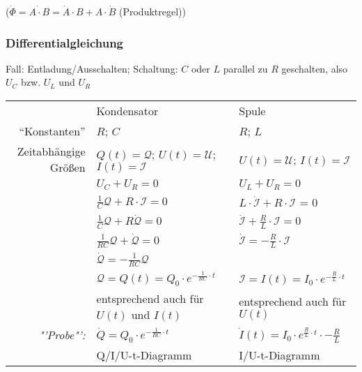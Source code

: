 \documentclass[a4paper]{scrartcl}
\begin{document}
($\dot{\Phi}=\dot{A \cdot B} = \dot{A} \cdot B + A \cdot \dot{B}$ 
(Produktregel))

\subsubsection{Differentialgleichung}
Fall: Entladung/Ausschalten; Schaltung: $C$ oder $L$ parallel zu $R$ 
geschalten, also $U_C$ bzw. $U_L$ und $U_R$
\\ \begin{tabular}{rl|l}
& Kondensator						& Spule \\ %
"`Konstanten"'&$R$; $C$				& $R$; $L$ \\
Zeitabhängige Größen & $Q(t)=\mathcal{Q}$; $U(t)=\mathcal{U}$; 
	$I(t)=\mathcal{I}$ 				& $U(t)=\mathcal{U}$; $I(t)=\mathcal{I}$ \\
& $U_C + U_R = 0$ & $U_L + U_R = 0$ \\
& $\frac{1}{C} \mathcal{Q} + R \cdot \mathcal{I} = 0$ &
	$L \cdot \dot{\mathcal{I}} + R \cdot \mathcal{I}$ = 0 \\
& $\frac{1}{C} \mathcal{Q} + R \dot{\mathcal{Q}} = 0$ &
	$\dot{\mathcal{I}} + \frac{R}{L} \cdot \mathcal{I} = 0$ \\
& $\frac{1}{RC} \mathcal{Q} + \dot{\mathcal{Q}} = 0$ &
	$\dot{\mathcal{I}} = -\frac{R}{L} \cdot \mathcal{I}$ \\
& $\dot{\mathcal{Q}} = - \frac{1}{RC} \mathcal{Q}$ & \\
\hline %
& $\mathcal{Q} = Q(t) = Q_0 \cdot e^{-\frac{1}{RC} \cdot t}$ &
	$\mathcal{I} = I(t) = I_0 \cdot e^{-\frac{R}{L} \cdot t}$ \\
& entsprechend auch für $U(t)$ und $I(t)$ & entsprechend auch für $U(t)$ \\
\emph{"'Probe"':} & $\dot{Q} = Q_0 \cdot e^{-\frac{1}{RC} \cdot t}$ &
	$\dot{I}(t) = I_0 \cdot e^{\frac{R}{L} \cdot t} \cdot -\frac{R}{L}$ \\
& Q/I/U-t-Diagramm & I/U-t-Diagramm \\
\end{tabular}
\end{document}
